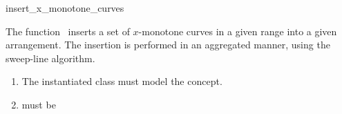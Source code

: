 \ccRefPageBegin

\begin{ccRefFunction}{insert_x_monotone_curves}

\ccDefinition

The function \ccRefName\ inserts a set of $x$-monotone curves in a given
range into a given arrangement. The insertion is performed in an aggregated
manner, using the sweep-line algorithm.



\ccRequirements
\begin{enumerate}
\item The instantiated  class must model the
   concept.
\item {} must be 
\end{enumerate}

\end{ccRefFunction}

\ccRefPageEnd
